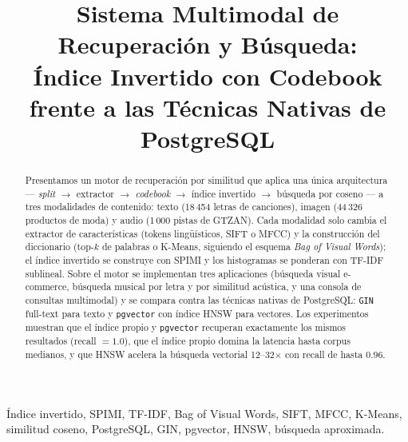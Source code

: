 \documentclass[conference]{IEEEtran}
\begin{document}
\title{Sistema Multimodal de Recuperación y Búsqueda:\\
Índice Invertido con Codebook frente a las Técnicas Nativas de PostgreSQL}

\author{
}

\maketitle

\begin{abstract}
Presentamos un motor de recuperación por similitud que aplica una única
arquitectura --- \textit{split} $\rightarrow$ extractor $\rightarrow$
\textit{codebook} $\rightarrow$ índice invertido $\rightarrow$ búsqueda por
coseno --- a tres modalidades de contenido: texto (18\,454 letras de
canciones), imagen (44\,326 productos de moda) y audio (1\,000 pistas de
GTZAN). Cada modalidad solo cambia el extractor de características (tokens
lingüísticos, SIFT o MFCC) y la construcción del diccionario (top-$k$ de
palabras o K-Means, siguiendo el esquema \textit{Bag of Visual Words}); el
índice invertido se construye con SPIMI y los histogramas se ponderan con
TF-IDF sublineal. Sobre el motor se implementan tres aplicaciones (búsqueda
visual e-commerce, búsqueda musical por letra y por similitud acústica, y una
consola de consultas multimodal) y se compara contra las técnicas nativas de
PostgreSQL: \texttt{GIN} full-text para texto y \texttt{pgvector} con índice
HNSW para vectores. Los experimentos muestran que el índice propio y
\texttt{pgvector} recuperan exactamente los mismos resultados
(recall $=1.0$), que el índice propio domina la latencia hasta corpus
medianos, y que HNSW acelera la búsqueda vectorial 12--32$\times$ con recall
de hasta $0.96$.
\end{abstract}

\begin{IEEEkeywords}
Índice invertido, SPIMI, TF-IDF, Bag of Visual Words, SIFT, MFCC, K-Means,
similitud coseno, PostgreSQL, GIN, pgvector, HNSW, búsqueda aproximada.
\end{IEEEkeywords}

\end{document}
